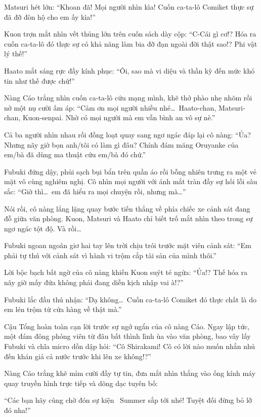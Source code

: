 \documentclass[../main.tex]{subfiles}
\begin{document}
Matsuri hét lớn:
``Khoan đã! Mọi người nhìn kìa! Cuốn ca-ta-lô Comiket thực sự đã đỡ đòn hộ cho em ấy kìa!''

Kuon trợn mắt nhìn vết thủng lớn trên cuốn sách dày cộp:
``C-Cái gì cơ!? Hóa ra cuốn ca-ta-lô đó thực sự có khả năng làm bia đỡ đạn ngoài đời thật sao!? Phi vật lý thế!''

Haato mắt sáng rực đầy kính phục:
``Ôi, sao mà vi diệu và thần kỳ đến mức khó tin như thế được chứ!''

Nàng Cáo trắng nhìn cuốn ca-ta-lô cứu mạng mình, khẽ thở phào nhẹ nhõm rồi nở một nụ cười ấm áp:
``Cảm ơn mọi người nhiều nhé\dots\ Haato-chan, Matsuri-chan, Kuon-senpai. Nhờ có mọi người mà em vẫn bình an vô sự nè.''

Cả ba người nhìn nhau rồi đồng loạt quay sang ngơ ngác đáp lại cô nàng:
``Ủa? Nhưng nãy giờ bọn anh/tôi có làm gì đâu? Chính đám măng Oruyanke của em/bà đã dùng ma thuật cứu em/bà đó chứ.''

Fubuki đứng dậy, phủi sạch bụi bẩn trên quần áo rồi bỗng nhiên trưng ra một vẻ mặt vô cùng nghiêm nghị. Cô nhìn mọi người với ánh mắt tràn đầy sự hối lỗi sâu sắc:
``Giờ thì\dots\ em đã hiểu ra mọi chuyện rồi, nhưng mà\dots''

Nói rồi, cô nàng lẳng lặng quay bước tiến thẳng về phía chiếc xe cảnh sát đang đỗ giữa văn phòng. Kuon, Matsuri và Haato chỉ biết trố mắt nhìn theo trong sự ngơ ngác tột độ. Và rồi\dots

Fubuki ngoan ngoãn giơ hai tay lên trời chịu trói trước mặt viên cảnh sát:
``Em phải tự thú với cảnh sát vì hành vi trộm cắp tài sản của mình thôi.''

Lời bộc bạch bất ngờ của cô nàng khiến Kuon suýt té ngửa:
``Ủa!? Thế hóa ra nãy giờ mấy đứa không phải đang diễn kịch nhập vai à!?''

Fubuki lắc đầu thú nhận:
``Dạ không\dots\ Cuốn ca-ta-lô Comiket đó thực chất là do em lén trộm từ cửa hàng về thật mà.''

Cậu Tổng hoàn toàn cạn lời trước sự ngớ ngẩn của cô nàng Cáo. Ngay lập tức, một đám đông phóng viên từ đâu bất thình lình ùa vào văn phòng, bao vây lấy Fubuki và chĩa micro dồn dập hỏi:
``Cô Shirakami! Cô có lời nào muốn nhắn nhủ đến khán giả cả nước trước khi lên xe không!?''

Nàng Cáo trắng khẽ mỉm cười đầy tự tin, đưa mắt nhìn thẳng vào ống kính máy quay truyền hình trực tiếp và dõng dạc tuyên bố:


``Các bạn hãy cùng chờ đón sự kiện \hll\ Summer sắp tới nhé! Tuyệt đối đừng bỏ lỡ đó nha!''
\end{document}
